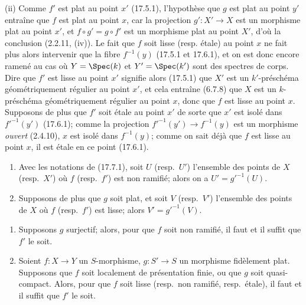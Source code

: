 (ii) Comme $f'$ est plat au point $x'$ (17.5.1), l'hypothèse que $g$ est plat au point $y'$ entraîne que $f$ est plat au point $x$, car la projection $g':X'\to X$ est un morphisme plat au point $x'$, et $f\circ g'=g\circ f'$ est un morphisme plat au point $X'$, d'où la conclusion (2.2.11, (iv)). Le fait que $f$ soit lisse (resp. étale) au point $x$ ne fait plus alors intervenir que la fibre $f^{-1}(y)$ (17.5.1 et 17.6.1), et on est donc encore ramené au cas où $Y=\Spec(k)$ et $Y'=\Spec(k')$ sont des spectres de corps. Dire que $f'$ est lisse au point $x'$ signifie alors (17.5.1) que $X'$ est un $k'$-préschéma géométriquement régulier au point $x'$, et cela entraîne (6.7.8) que $X$ est un $k$-préschéma géométriquement régulier au point $x$, donc que $f$ est lisse au point $x$. Supposons de plus que $f'$ soit étale au point $x'$ de sorte que $x'$ est isolé dans $f'^{-1}(y')$ (17.6.1); comme la projection $f'^{-1}(y')\to f^{-1}(y)$ est un morphisme \emph{ouvert} (2.4.10), $x$ est isolé dans $f^{-1}(y)$; comme on sait déjà que $f$ est lisse au point $x$, il est étale en ce point (17.6.1).

\begin{corollary}[17.7.2]
\label{IV.17.7.2}
\begin{enumerate}
  \item[\textup{(i)}] Avec les notations de \textup{(17.7.1)}, soit $U$ \textup{(resp.}\ $U'$\textup{)} l'ensemble des points de $X$ \textup{(resp.}\ $X'$\textup{)} où $f$ \textup{(resp.}\ $f'$\textup{)} est non ramifié; alors on a $U'=g'^{-1}(U)$.
  \item[\textup{(ii)}] Supposons de plus que $g$ soit plat, et soit $V$ \textup{(resp.}\ $V'$\textup{)} l'ensemble des points de $X$ où $f$ \textup{(resp.}\ $f'$\textup{)} est lisse; alors $V'=g'^{-1}(V)$.
\end{enumerate}
\end{corollary}

\begin{corollary}[17.7.3]
\label{IV.17.7.3}
\begin{enumerate}
  \item[\textup{(i)}] Supposons $g$ surjectif; alors, pour que $f$ soit non ramifié, il faut et il suffit que $f'$ le soit.
  \item[\textup{(ii)}] Soient $f:X\to Y$ un $S$-morphisme, $g:S'\to S$ un morphisme fidèlement plat. Supposons que $f$ soit localement de présentation finie, \textup{ou} que $g$ soit quasi-compact. Alors, pour que $f$ soit lisse \textup{(resp.}\ non ramifié, \textup{resp.}\ étale\textup{)}, il faut et il suffit que $f'$ le soit.
\end{enumerate}
\end{corollary}


